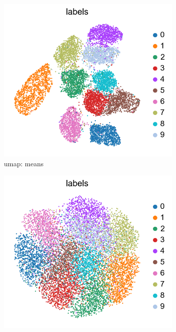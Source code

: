 \documentclass[11pt, a4paper]{report}
\theoremstyle{plain}
\theoremstyle{definition}
\theoremstyle{remark}
\begin{document}
\begin{figure}[h]
\centering
\begin{subfigure}[t]{0.3\textwidth}
\includegraphics[width=\textwidth]{images/vae.umap.mnist.mu.png}
\caption{umap: means}
\label{fig:vaeumapmeans}
\end{subfigure}
\begin{subfigure}[t]{0.3\textwidth}
\includegraphics[width=\textwidth]{images/vae.umap.mnist.sampling.png}

\end{subfigure}
\end{figure}
\end{document}
